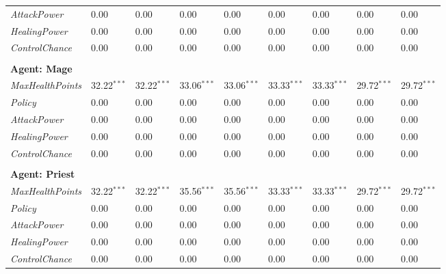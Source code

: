 \begin{tabular}{lllllllll}
\textit{AttackPower}     & 0.00                    & 0.00      & 0.00 &   0.00 & 0.00 & 0.00 & 0.00  & 0.00         \\
\textit{HealingPower}    & 0.00                   & 0.00     & 0.00  & 0.00 & 0.00 & 0.00 & 0.00  & 0.00        \\
\textit{ControlChance}   & 0.00                   & 0.00    & 0.00    & 0.00 & 0.00   & 0.00 & 0.00  & 0.00        \\
&                           & & & & &                          & &\\
\textbf{Agent: Mage }        &                           &                           & &\\
\textit{MaxHealthPoints} & 32.22${}^{***}$                   & 32.22${}^{***}$ & 33.06${}^{***}$ &  33.06${}^{***}$ & 33.33${}^{***}$  & 33.33${}^{***}$ & 29.72${}^{***}$  & 29.72${}^{***}$                \\
\textit{Policy}     & 0.00                    & 0.00      & 0.00 &   0.00 & 0.00 & 0.00 & 0.00  & 0.00         \\
\textit{AttackPower}     & 0.00                    & 0.00      & 0.00 &   0.00 & 0.00 & 0.00 & 0.00  & 0.00         \\
\textit{HealingPower}    & 0.00                   & 0.00     & 0.00  & 0.00 & 0.00 & 0.00 & 0.00  & 0.00        \\
\textit{ControlChance}   & 0.00                   & 0.00    & 0.00    & 0.00 & 0.00   & 0.00 & 0.00  & 0.00        \\
&                           & & & & &                          & &\\
\textbf{Agent: Priest }        &                           &                           & &\\
\textit{MaxHealthPoints} & 32.22${}^{***}$                   & 32.22${}^{***}$ & 35.56${}^{***}$ &  35.56${}^{***}$ & 33.33${}^{***}$  & 33.33${}^{***}$ & 29.72${}^{***}$  & 29.72${}^{***}$                \\
\textit{Policy}     & 0.00                    & 0.00      & 0.00 &   0.00 & 0.00 & 0.00 & 0.00  & 0.00         \\
\textit{AttackPower}     & 0.00                    & 0.00      & 0.00 &   0.00 & 0.00 & 0.00 & 0.00  & 0.00         \\
\textit{HealingPower}    & 0.00                   & 0.00     & 0.00  & 0.00 & 0.00 & 0.00 & 0.00  & 0.00        \\
\textit{ControlChance}   & 0.00                   & 0.00    & 0.00    & 0.00 & 0.00   & 0.00 & 0.00  & 0.00        \\

\end{tabular}
